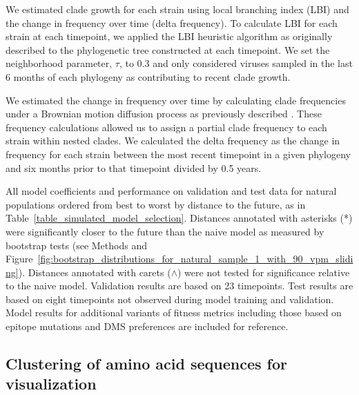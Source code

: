 We estimated clade growth for each strain using local branching index (LBI) and the change in frequency over time (delta frequency).
To calculate LBI for each strain at each timepoint, we applied the LBI heuristic algorithm as originally described \citep{Neher:2014eu} to the phylogenetic tree constructed at each timepoint.
We set the neighborhood parameter, $\tau$, to 0.3 and only considered viruses sampled in the last 6 months of each phylogeny as contributing to recent clade growth.

We estimated the change in frequency over time by calculating clade frequencies under a Brownian motion diffusion process as previously described \citep{Lee2018}.
These frequency calculations allowed us to assign a partial clade frequency to each strain within nested clades.
We calculated the delta frequency as the change in frequency for each strain between the most recent timepoint in a given phylogeny and six months prior to that timepoint divided by 0.5 years.

\begin{table}
  \begin{center}
    \scalebox{0.9}{
        
    }
    \caption{
      All model coefficients and performance on validation and test data for natural populations ordered from best to worst by distance to the future, as in Table~\ref{table_simulated_model_selection}.
      Distances annotated with asterisks (*) were significantly closer to the future than the naive model as measured by bootstrap tests (see Methods and Figure~\ref{fig:bootstrap_distributions_for_natural_sample_1_with_90_vpm_sliding}).
      Distances annotated with carets ($\wedge$) were not tested for significance relative to the naive model.
      Validation results are based on 23 timepoints.
      Test results are based on eight timepoints not observed during model training and validation.
      Model results for additional variants of fitness metrics including those based on epitope mutations and DMS preferences are included for reference.
    }
    \label{table:complete_natural_model_selection}
  \end{center}
\end{table}

\subsection*{Clustering of amino acid sequences for visualization}

